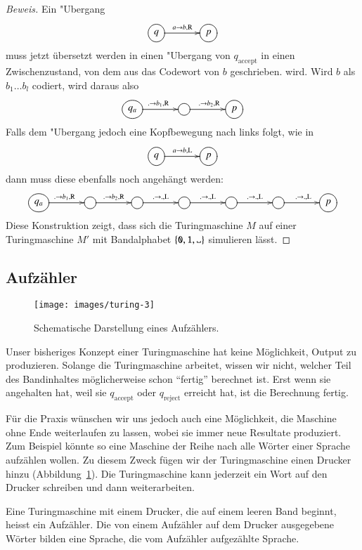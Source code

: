 \begin{proof}[Beweis]
Ein "Ubergang
\[
\entrymodifiers={++[o][F]}
\xymatrix@C+1pc{
q\ar[r]^{a\to b,\text{R}}
	&p
}
\]
muss jetzt übersetzt werden in einen "Ubergang von $q_\text{accept}$ in einen
Zwischenzustand, von dem aus das Codewort von $b$ geschrieben.
wird. Wird $b$ als $b_1\dots b_l$ codiert, wird daraus also
\[
\entrymodifiers={++[o][F]}
\xymatrix@C+1pc{
q_a\ar[r]^{.\to b_1,\text{R}}
	&\ar[r]^{.\to b_2,\text{R}}
		&p
}
\]
Falls dem "Ubergang jedoch eine Kopfbewegung nach links folgt, wie in
\[
\entrymodifiers={++[o][F]}
\xymatrix@C+1pc{
q\ar[r]^{a\to b,\text{L}}
	&p
}
\]
dann muss diese ebenfalls noch angehängt werden:
\[
\entrymodifiers={++[o][F]}
\xymatrix@C+1pc{
q_a\ar[r]^{.\to b_1,\text{R}}
	&\ar[r]^{.\to b_2,\text{R}}
		&\ar[r]^{.\to .,\text{L}}
			&\ar[r]^{.\to .,\text{L}}
				&\ar[r]^{.\to .,\text{L}}
					&\ar[r]^{.\to .,\text{L}}
						&p
}
\]
Diese Konstruktion zeigt, dass sich die Turingmaschine $M$ auf einer
Turingmaschine $M'$ mit Bandalphabet $\{\texttt{0},\texttt{1},\blank\}$ simulieren
lässt.
\end{proof}

\subsection{Aufzähler}
\begin{figure}
\begin{center}
\texttt{[image: images/turing-3]}
\end{center}
\caption{Schematische Darstellung eines Aufzählers.\label{turing-aufzaehler}}
\end{figure}
Unser bisheriges Konzept einer Turingmaschine hat keine Möglichkeit,
Output zu produzieren. Solange die Turingmaschine arbeitet, wissen wir
nicht, welcher Teil des Bandinhaltes möglicherweise schon ``fertig''
berechnet ist. Erst wenn sie angehalten hat, weil sie $q_{\text{accept}}$
oder $q_{\text{reject}}$ erreicht hat, ist die Berechnung fertig.

Für die Praxis wünschen wir uns jedoch auch eine Möglichkeit,
die Maschine ohne Ende weiterlaufen zu lassen, wobei sie immer neue
Resultate produziert. Zum Beispiel könnte so eine Maschine der Reihe
nach alle Wörter einer Sprache aufzählen wollen. Zu diesem Zweck
fügen wir der Turingmaschine einen Drucker hinzu
(Abbildung~\ref{turing-aufzaehler}). Die Turingmaschine
kann jederzeit ein Wort auf den Drucker schreiben und dann
weiterarbeiten.

\begin{definition}
Eine Turingmaschine mit einem Drucker, die auf einem leeren Band beginnt,
heisst ein Aufzähler. Die von einem Aufzähler auf dem Drucker ausgegebene
Wörter bilden eine Sprache, die vom Aufzähler aufgezählte Sprache.
\end{definition}

